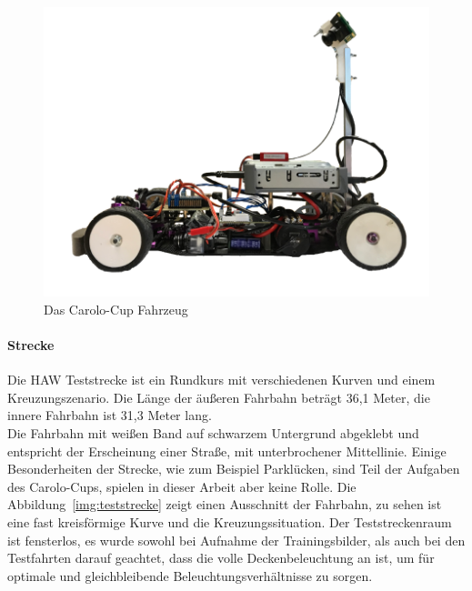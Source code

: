 \begin{figure}[h]
	\centering
	\includegraphics[scale=0.3]{figures/Fahrzeug.png}
	\caption{Das Carolo-Cup Fahrzeug}
	\label{img:Carolo-Fahrzeug}
\end{figure}

\paragraph{Strecke}
Die HAW Teststrecke ist ein Rundkurs mit verschiedenen Kurven und einem Kreuzungszenario. Die Länge der äußeren Fahrbahn beträgt 36,1 Meter, die innere Fahrbahn ist 31,3 Meter lang.\\
Die Fahrbahn mit weißen Band auf schwarzem Untergrund abgeklebt und entspricht der Erscheinung einer Straße, mit unterbrochener Mittellinie. Einige Besonderheiten der Strecke, wie zum Beispiel Parklücken, sind Teil der Aufgaben des Carolo-Cups, spielen in dieser Arbeit aber keine Rolle.
Die Abbildung~\ref{img:teststrecke} zeigt einen Ausschnitt der Fahrbahn, zu sehen ist eine fast kreisförmige Kurve und die Kreuzungssituation. 
Der Teststreckenraum ist fensterlos, es wurde sowohl bei Aufnahme der Trainingsbilder, als auch bei den Testfahrten darauf geachtet, dass die volle Deckenbeleuchtung an ist, um für optimale und gleichbleibende Beleuchtungsverhältnisse zu sorgen.

